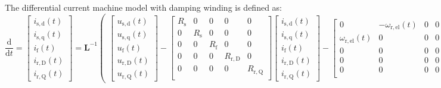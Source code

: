 \begin{solutionblock}
    The differential current machine model with damping winding is defined as:
    \begin{equation}
        \frac{\mathrm{d}}{\mathrm{d}t}=
        \begin{bmatrix}
            i_{\mathrm{s,d}}(t) \\
            i_{\mathrm{s,q}}(t) \\
            i_{\mathrm{f}}(t) \\
            i_{\mathrm{r,D}}(t) \\
            i_{\mathrm{r,Q}}(t)
        \end{bmatrix}
        =
        \bm{L}^{-1}
        \begin{pmatrix}
            \begin{bmatrix}
                u_{\mathrm{s,d}}(t) \\
                u_{\mathrm{s,q}}(t) \\
                u_{\mathrm{f}}(t) \\
                u_{\mathrm{r,D}}(t) \\
                u_{\mathrm{r,Q}}(t)
            \end{bmatrix}
            -
            \begin{bmatrix}
                R_{\mathrm{s}} & 0 & 0 & 0 & 0 \\
                0 & R_{\mathrm{s}} & 0 & 0 & 0 \\
                0 & 0 & R_{\mathrm{f}} & 0 & 0 \\
                0 & 0 & 0 & R_{\mathrm{r,D}} & 0 \\
                0 & 0 & 0 & 0 & R_{\mathrm{r,Q}} \\
            \end{bmatrix}
            \begin{bmatrix}
                i_{\mathrm{s,d}}(t) \\
                i_{\mathrm{s,q}}(t) \\
                i_{\mathrm{f}}(t) \\
                i_{\mathrm{r,D}}(t) \\
                i_{\mathrm{r,Q}}(t)
            \end{bmatrix}
            -
            \begin{bmatrix}
                0 & -\omega_{\mathrm{r,el}}(t) & 0 & 0 & 0 \\
                \omega_{\mathrm{r,el}}(t) & 0 & 0  & 0 & 0 \\
                0 & 0 & 0 & 0 & 0 \\
                0 & 0 & 0 & 0 & 0 \\
                0 & 0 & 0 & 0 & 0 \\
            \end{bmatrix}
        \end{pmatrix}.
    \end{equation}


\end{solutionblock}
